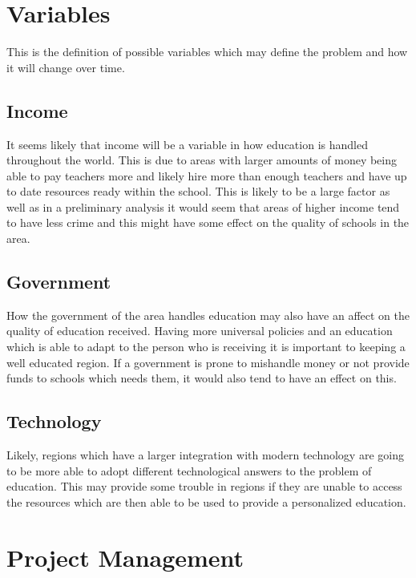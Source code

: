 \documentclass[11pt]{article}
\begin{document}
	\newpage
	\section{Variables}
	This is the definition of possible variables which may define the problem and how it will change over time.
	
	\subsection{Income}
	It seems likely that income will be a variable in how education is handled throughout the world. This is due to areas with larger amounts of money being able to pay teachers more and likely hire more than enough teachers and have up to date resources ready within the school. This is likely to be a large factor as well as in a preliminary analysis it would seem that areas of higher income tend to have less crime and this might have some effect on the quality of schools in the area.
	
	\subsection{Government}
	How the government of the area handles education may also have an affect on the quality of education received. Having more universal policies and an education which is able to adapt to the person who is receiving it is important to keeping a well educated region. If a government is prone to mishandle money or not provide funds to schools which needs them, it would also tend to have an effect on this.
	
	\subsection{Technology}
	Likely, regions which have a larger integration with modern technology are going to be more able to adopt different technological answers to the problem of education. This may provide some trouble in regions if they are unable to access the resources which are then able to be used to provide a personalized education. 
	
	\newpage
	\section{Project Management}
\end{document}
